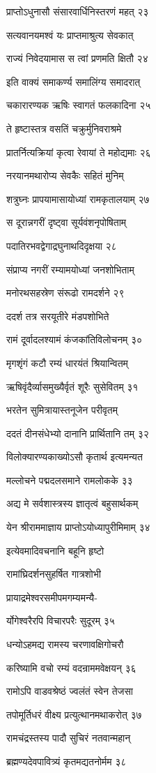 प्राप्तोऽधुनासौ संसारवार्धिनिस्तरणं महत् २३

सत्यवानयमश्वं यः प्राप्तमाश्रुत्य सेवकात्

राज्यं निवेदयामास स त्वां प्रणमति क्षितौ २४

इति वाक्यं समाकर्ण्य समालिंग्य समादरात्

चकारारण्यक ऋषिः स्वागतं फलकादिना २५

ते हृष्टास्तत्र वसतिं चक्रुर्मुनिवराश्रमे

प्रातर्नित्यक्रियां कृत्वा रेवायां ते महोद्यमाः २६

नरयानमथारोप्य सेवकैः सहितं मुनिम्

शत्रुघ्नः प्रापयामासायोध्यां रामकृतालयाम् २७

स दूरान्नगरीं दृष्ट्वा सूर्यवंशनृपोषिताम्

पदातिरभवद्वेगाद्रघुनाथदिदृक्षया २८

संप्राप्य नगरीं रम्यामयोध्यां जनशोभिताम्

मनोरथसहस्रेण संरूढो रामदर्शने २९

ददर्श तत्र सरयूतीरे मंडपशोभिते

रामं दूर्वादलश्यामं कंजकांतिविलोचनम् ३०

मृगशृंगं कटौ रम्यं धारयंतं श्रियान्वितम्

ऋषिवृंदैर्व्यासमुख्यैर्वृतं शूरैः सुसेवितम् ३१

भरतेन सुमित्रायास्तनूजेन परीवृतम्

ददतं दीनसंधेभ्यो दानानि प्रार्थितानि तम् ३२

विलोक्यारण्यकाख्योऽसौ कृतार्थ इत्यमन्यत

मल्लोचने पद्मदलसमाने रामलोकके ३३

अद्य मे सर्वशास्त्रस्य ज्ञातृत्वं बहुसार्थकम्

येन श्रीराममाज्ञाय प्राप्तोऽयोध्यापुरीमिमाम् ३४

इत्येवमादिवचनानि बहूनि हृष्टो

रामांघ्रिदर्शनसुहर्षित गात्रशोभी

प्रायाद्रमेश्वरसमीपमगम्यमन्यै-

र्योगेश्वरैरपि विचारपरैः सुदूरम् ३५

धन्योऽहमद्य रामस्य चरणावक्षिगोचरौ

करिष्यामि वचो रम्यं वदन्राममवेक्षयन् ३६

रामोऽपि वाडवश्रेष्ठं ज्वलंतं स्वेन तेजसा

तपोमूर्तिधरं वीक्ष्य प्रत्युत्थानमथाकरोत् ३७

रामचंद्रस्तस्य पादौ सुचिरं नतवान्महान्

ब्रह्मण्यदेवपावित्र्यं कृतमद्यतनोर्मम ३८

